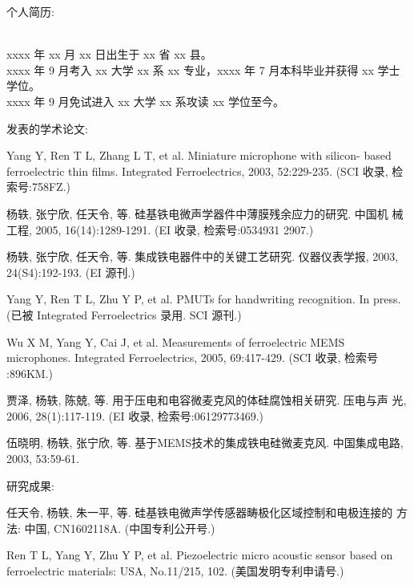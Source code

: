 \noindent\begin{bfseries}个人简历:\end{bfseries}\\
xxxx 年 xx 月 xx 日出生于 xx 省 xx 县。\\
xxxx 年 9 月考入 xx 大学 xx 系 xx 专业，xxxx 年 7 月本科毕业并获得 xx 学士学位。\\
xxxx 年 9 月免试进入 xx 大学 xx 系攻读 xx 学位至今。

\noindent\begin{bfseries}发表的学术论文:\end{bfseries} %
\begin{enumerate}[{[}1{]}]
\item Yang Y, Ren T L, Zhang L T, et al. Miniature microphone with silicon-
  based ferroelectric thin films. Integrated Ferroelectrics, 2003,
  52:229-235. (SCI 收录, 检索号:758FZ.)
\item 杨轶, 张宁欣, 任天令, 等. 硅基铁电微声学器件中薄膜残余应力的研究. 中国机
  械工程, 2005, 16(14):1289-1291. (EI 收录, 检索号:0534931 2907.)
\item 杨轶, 张宁欣, 任天令, 等. 集成铁电器件中的关键工艺研究. 仪器仪表学报,
  2003, 24(S4):192-193. (EI 源刊.)
\item Yang Y, Ren T L, Zhu Y P, et al. PMUTs for handwriting recognition. In
  press. (已被 Integrated Ferroelectrics 录用. SCI 源刊.)
\item Wu X M, Yang Y, Cai J, et al. Measurements of ferroelectric MEMS
  microphones. Integrated Ferroelectrics, 2005, 69:417-429. (SCI 收录, 检索号
  :896KM.)
\item 贾泽, 杨轶, 陈兢, 等. 用于压电和电容微麦克风的体硅腐蚀相关研究. 压电与声
  光, 2006, 28(1):117-119. (EI 收录, 检索号:06129773469.)
\item 伍晓明, 杨轶, 张宁欣, 等. 基于MEMS技术的集成铁电硅微麦克风. 中国集成电路, 
  2003, 53:59-61.
\end{enumerate}

\noindent\begin{bfseries} 研究成果: \end{bfseries}%
\begin{enumerate}[{[}1{]}]
\item 任天令, 杨轶, 朱一平, 等. 硅基铁电微声学传感器畴极化区域控制和电极连接的
  方法: 中国, CN1602118A. (中国专利公开号.)
\item Ren T L, Yang Y, Zhu Y P, et al. Piezoelectric micro acoustic sensor
  based on ferroelectric materials: USA, No.11/215, 102. (美国发明专利申请号.)
\end{enumerate}